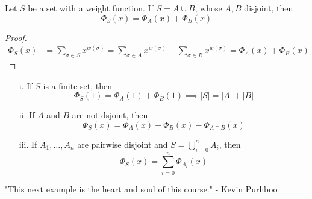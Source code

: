\documentclass[english, 11pt]{article}
\begin{document}
   \begin{lem}\label{sumlemma}
     Let $S$ be a set with a weight function. If $S = A \cup B$, whose $A,B$ disjoint, then
     \[ \Phi_S(x) = \Phi_A(x) + \Phi_B(x) \]
   \end{lem}

   \begin{proof}
     \begin{align*}
        \Phi_S(x) & =\sum_{\sigma \in S} x^{w(\sigma)}
         = \sum_{\sigma \in A}x^{w(\sigma)} + \sum_{\sigma \in B}x^{w(\sigma)}
        = \Phi_A(x) + \Phi_B(x)
      \end{align*}
   \end{proof}

   \begin{note}
     \begin{itemize}
       \item [i.] If $S$ is a finite set, then
       \[ \Phi_S(1) = \Phi_A(1) + \Phi_B(1) \implies |S| = |A| + |B| \]
       \item [ii.] If $A$ and $B$ are not dsjoint, then
       \[ \Phi_S(x) = \Phi_A(x) + \Phi_B(x) - \Phi_{A\cap B}(x) \]
       \item [iii.] If $A_1, \ldots, A_n$ are pairwise disjoint and $S = \bigcup_{i=0}^n A_i$, then
       \[ \Phi_S(x) = \sum_{i=0}^n \Phi_{A_i}(x) \]
     \end{itemize}
   \end{note}

   "This next example is the heart and soul of this course." - Kevin Purhboo
\end{document}
